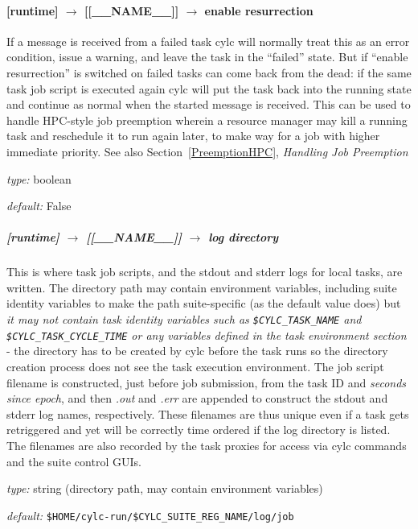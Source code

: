 \paragraph[enable resurrection]{ [runtime] $\rightarrow$ [[\_\_NAME\_\_]] $\rightarrow$ enable resurrection}

If a message is received from a failed task cylc will normally treat
this as an error condition, issue a warning, and leave the task in the
``failed'' state.  But if ``enable resurrection'' is switched on failed
tasks can come back from the dead: if the same task job script is
executed again cylc will put the task back into the running state and
continue as normal when the started message is received. This can be
used to handle HPC-style job preemption wherein a resource manager may
kill a running task and reschedule it to run again later, to make way
for a job with higher immediate priority. See also
Section~\ref{PreemptionHPC}, {\em Handling Job Preemption}
\begin{myitemize}
\item {\em type:} boolean
\item {\em default:} False
\end{myitemize}


\subparagraph[log directory]{[runtime] $\rightarrow$ [[\_\_NAME\_\_]] $\rightarrow$ log directory}
\label{LocalLog}

This is where task job scripts, and the stdout and stderr logs for local
tasks, are written. The directory path may contain environment
variables, including suite identity variables to make the path
suite-specific (as the default value does) but {\em it may not 
contain task identity variables such as \lstinline=$CYLC_TASK_NAME= and
\lstinline=$CYLC_TASK_CYCLE_TIME= or any variables defined in the task
environment section} - the directory has to be created by cylc before
the task runs so the directory creation process does not see the task
execution environment.
The job script filename is constructed, just before job submission,
from the task ID and {\em seconds since epoch}, and then {\em .out} and
{\em .err} are appended to construct the stdout and stderr log names,
respectively. These filenames are thus unique even if a task
gets retriggered and yet will be correctly time ordered if the log
directory is listed. The filenames are also recorded by the task proxies 
for access via cylc commands and the suite control GUIs.
\begin{myitemize}
\item {\em type:} string (directory path, may contain environment variables)
\item {\em default:} \lstinline=$HOME/cylc-run/$CYLC_SUITE_REG_NAME/log/job=
\end{myitemize}

